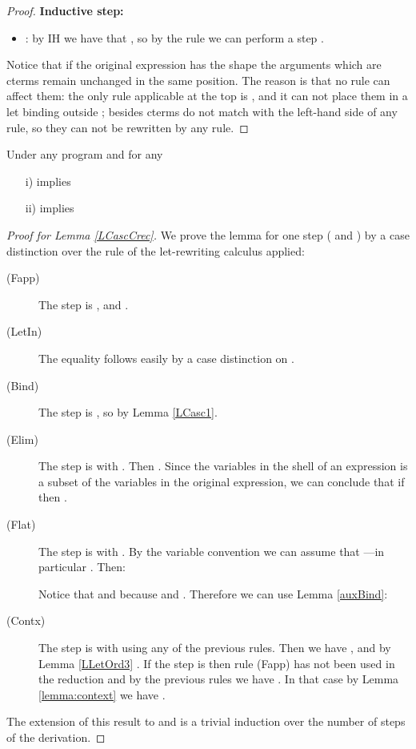 \begin{proof}
{\bf Inductive step:}
\begin{itemize}
    \item : by IH we have that , so by the rule  we can perform a step .
\end{itemize}


Notice that if the original expression has the shape  the arguments  which are cterms remain unchanged in the same position. The reason is that no rule can affect them: the only rule applicable at the top is , and it can not place them in a let binding outside ; besides cterms do not match with the left-hand side of any rule, so they can not be rewritten by any rule.
\end{proof}





Under any program  and for any 
\begin{enumerate}
    \item[i)]  implies 
    \item[ii)]  implies 
\end{enumerate}

\begin{proof}[Proof for Lemma \ref{LCascCrec}]\label{DEMO_LCascCrec}
We prove the lemma for one step ( and ) by a case distinction over the rule of the let-rewriting calculus applied:
\begin{description}
\item[(Fapp)] The step is , and .

\item[(LetIn)] The equality  follows easily by a case distinction on .


\item[(Bind)] The step is , so  by Lemma \ref{LCasc1}.


\item[(Elim)] The step is  with . Then . Since the variables in the shell of an expression is a subset of the variables in the original expression, we can conclude that if  then .

\item[(Flat)] The step is  with . By the variable convention we can assume that  ---in particular . Then:
        
        Notice that  and  because  and . Therefore we can use Lemma \ref{auxBind}:
        

\item[(Contx)] The step is  with  using any of the previous rules. Then we have , and by Lemma \ref{LLetOrd3} . If the step is  then rule (Fapp) has not been used in the reduction  and by the previous rules we have . In that case by Lemma \ref{lemma:context} we have .
\end{description}
The extension of this result to  and  is a trivial induction over the number of steps of the derivation.
\end{proof}




